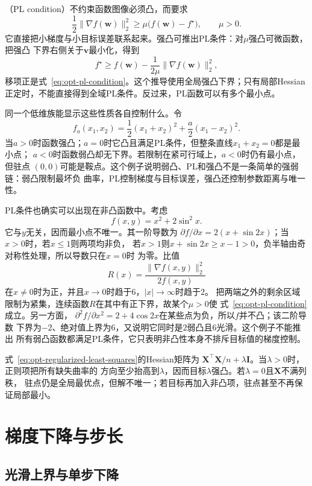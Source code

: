 （PL condition）不约束函数图像必须凸，而要求
\begin{equation}
  \frac{1}{2}\lVert\nabla f(\bm{w})\rVert_2^2
  \geq \mu\bigl(f(\bm{w})-f^{\star}\bigr),
  \qquad \mu>0.
  \label{eq:opt-pl-condition}
\end{equation}
它直接把小梯度与小目标误差联系起来。强凸可推出PL条件：对$\mu$强凸可微函数，把强凸
下界右侧关于$\bm{v}$最小化，得到
\[
  f^\star\geq
  f(\bm{w})-\frac{1}{2\mu}\lVert\nabla f(\bm{w})\rVert_2^2,
\]
移项正是式~\eqref{eq:opt-pl-condition}。这个推导使用全局强凸下界；只有局部Hessian
正定时，不能直接得到全域PL条件。反过来，PL函数可以有多个最小点。

同一个低维族能显示这些性质各自控制什么。令
\[
  f_a(x_1,x_2)=\frac12(x_1+x_2)^2+\frac{a}{2}(x_1-x_2)^2.
\]
当$a>0$时函数强凸；$a=0$时它凸且满足PL条件，但整条直线$x_1+x_2=0$都是最小点；
$a<0$时函数弱凸却无下界。若限制在紧可行域上，$a<0$时仍有最小点，但驻点
$(0,0)$可能是鞍点。这个例子说明弱凸、PL和强凸不是一条简单的强弱链：弱凸限制最坏负
曲率，PL控制梯度与目标误差，强凸还控制参数距离与唯一性。

PL条件也确实可以出现在非凸函数中。考虑
\[
  f(x,y)=x^2+2\sin^2x.
\]
它与$y$无关，因而最小点不唯一。其一阶导数为
$\partial f/\partial x=2(x+\sin 2x)$；当$x>0$时，若$x\leq1$则两项均非负，
若$x>1$则$x+\sin2x\geq x-1>0$，负半轴由奇对称性处理，所以导数只在$x=0$时
为零。比值
\[
  R(x)=\frac{\lVert\nabla f(x,y)\rVert_2^2}{2f(x,y)}
\]
在$x\neq0$时为正，并且$x\to0$时趋于$6$，$|x|\to\infty$时趋于$2$。
把两端之外的剩余区域限制为紧集，连续函数$R$在其中有正下界，故某个$\mu>0$使
式~\eqref{eq:opt-pl-condition}成立。另一方面，
$\partial^2 f/\partial x^2=2+4\cos2x$在某些点为负，所以$f$并不凸；该二阶导数
下界为$-2$、绝对值上界为$6$，又说明它同时是$2$弱凸且$6$光滑。这个例子不能推出
所有弱凸函数都满足PL条件，它只表明非凸性本身不排斥目标值的梯度控制。

式~\eqref{eq:opt-regularized-least-squares}的Hessian矩阵为
$\bm{X}^{\top}\bm{X}/n+\lambda\bm{I}$。当$\lambda>0$时，正则项把所有缺失曲率的
方向至少抬高到$\lambda$，因而目标$\lambda$强凸。若$\lambda=0$且$\bm{X}$不满列秩，
驻点仍是全局最优点，但解不唯一；若目标再加入非凸项，驻点甚至不再保证局部最小。

\section{梯度下降与步长}
\label{sec:opt-gradient-descent}

\subsection{光滑上界与单步下降}

